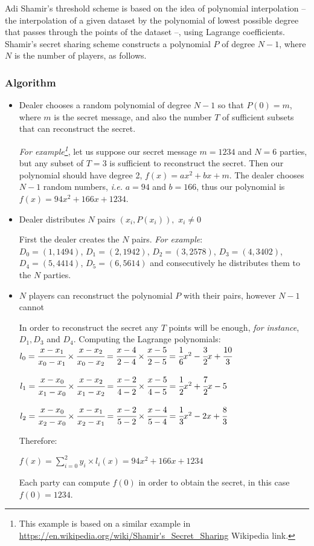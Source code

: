 Adi Shamir's threshold scheme is based on the idea of polynomial interpolation -- the interpolation of a given dataset by the polynomial of lowest possible degree that passes through the points of the dataset --, using Lagrange coefficients.
Shamir's secret sharing scheme constructs a polynomial $P$ of degree $N-1$, where $N$ is the number of players, as follows.


\subsubsection{Algorithm}\label{sss:shamir-algorithm}
\begin{itemize}
  \item Dealer chooses a random polynomial of degree $N − 1$ so that $P(0) = m$, where $m$ is the secret message, and also the number $T$ of sufficient subsets that can reconstruct the secret.

  \textit{For example\footnote{This example is based on a similar example in \url{https://en.wikipedia.org/wiki/Shamir's_Secret_Sharing} Wikipedia link.}}, let us suppose our secret message $m = 1234$ and $N = 6$ parties, but any subset of $T = 3$ is sufficient to reconstruct the secret.
  Then our polynomial should have degree 2, $f(x) = ax^2 + bx + m$.
  The dealer chooses $N - 1$ random numbers, \textit{i.e.} $a = 94$ and $b = 166$, thus our polynomial is $f(x) = 94x^2 + 166x + 1234$.


  \item Dealer distributes $N$ pairs $(x_i , P(x_i)),$ $x_i \neq 0$

  First the dealer creates the $N$ pairs.
  \textit{For example}:\\
  $D_0 = (1, 1494)$, $D_1 = (2, 1942)$, $D_2 = (3, 2578)$, $D_3 = (4, 3402)$, $D_4 = (5, 4414)$, $D_5 = (6, 5614)$ and consecutively he distributes them to the $N$ parties.


  \item $N$ players can reconstruct the polynomial $P$ with their pairs, however $N - 1$ cannot

  In order to reconstruct the secret any $T$ points will be enough, \textit{for instance}, $D_1, D_3$ and $D_4$.
  Computing the Lagrange polynomials:\\
  $l_0 = \cfrac{x - x_1}{x_0 - x_1} \times \cfrac{x - x_2}{x_0 - x_2} = \cfrac{x - 4}{2 - 4} \times \cfrac{x - 5}{2 - 5} = \cfrac{1}{6}x^2 - \cfrac{3}{2}x + \cfrac{10}{3}$

  $l_1 = \cfrac{x - x_0}{x_1 - x_0} \times \cfrac{x - x_2}{x_1 - x_2} = \cfrac{x - 2}{4 - 2} \times \cfrac{x - 5}{4 - 5} = \cfrac{1}{2}x^2 + \cfrac{7}{2}x - 5$

  $l_2 = \cfrac{x - x_0}{x_2 - x_0} \times \cfrac{x - x_1}{x_2 - x_1} = \cfrac{x - 2}{5 - 2} \times \cfrac{x - 4}{5 - 4} = \cfrac{1}{3}x^2 - 2x + \cfrac{8}{3}$

  Therefore:

  $f(x) = \sum_{i=0}^{2} y_i \times l_i(x) = 94x^2 + 166x + 1234$

  Each party can compute $f(0)$ in order to obtain the secret, in this case $f(0) = 1234$.
\end{itemize}

